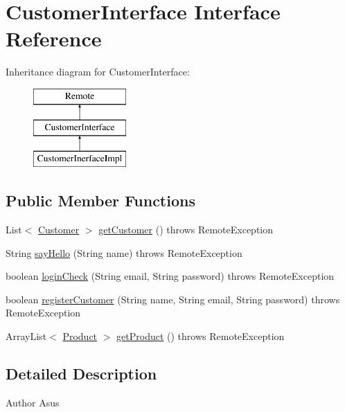 \hypertarget{interface_customer_interface}{}\section{Customer\+Interface Interface Reference}
\label{interface_customer_interface}
Inheritance diagram for Customer\+Interface\+:\begin{figure}[H]
\begin{center}
\leavevmode
\includegraphics[height=3.000000cm]{interface_customer_interface}
\end{center}
\end{figure}
\subsection*{Public Member Functions}
\begin{DoxyCompactItemize}
\item 
List$<$ \mbox{\hyperlink{class_customer}{Customer}} $>$ \mbox{\hyperlink{interface_customer_interface_ae6fd6f70022bbb0e6600c7bcaf3e139c}{get\+Customer}} ()  throws Remote\+Exception
\item 
String \mbox{\hyperlink{interface_customer_interface_a9ab16776cf93e41a43e58f890189e3d1}{say\+Hello}} (String name)  throws Remote\+Exception
\item 
boolean \mbox{\hyperlink{interface_customer_interface_aded022cc5a8b728bc07ded2267fd4f07}{login\+Check}} (String email, String password)  throws Remote\+Exception
\item 
boolean \mbox{\hyperlink{interface_customer_interface_ad0130eaa14a8f40060a9328aeedab244}{register\+Customer}} (String name, String email, String password)  throws Remote\+Exception
\item 
Array\+List$<$ \mbox{\hyperlink{class_product}{Product}} $>$ \mbox{\hyperlink{interface_customer_interface_a671bbfd3dfb9bbc58d3c9d04f38da627}{get\+Product}} ()  throws Remote\+Exception
\end{DoxyCompactItemize}


\subsection{Detailed Description}
\begin{DoxyAuthor}{Author}
Asus 
\end{DoxyAuthor}



